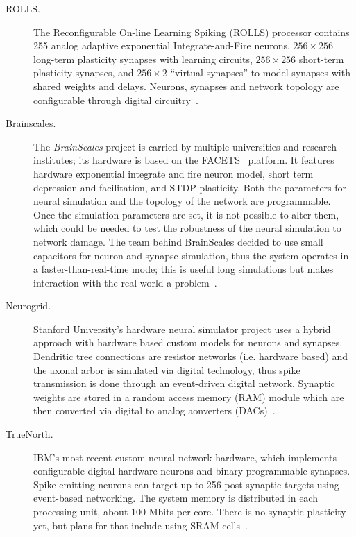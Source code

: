 \begin{description}
  
\item[ROLLS.] The Reconfigurable On-line Learning Spiking (ROLLS) processor 
contains 255 analog adaptive exponential Integrate-and-Fire neurons, $256\times 
256$ long-term plasticity synapses with learning circuits, $256\times 256$ 
short-term plasticity synapses, and $256\times 2$ ``virtual synapses'' to model 
synapses with shared weights and delays. Neurons, synapses and network topology 
are configurable through digital circuitry~\cite{rolls-processor}.

\item[Brainscales.] The \emph{BrainScales} project is carried by multiple universities and research institutes; its hardware is based on the FACETS~ platform\cite{brainscales-schemmel2010wafer}. It features hardware exponential integrate and fire neuron model, short term depression and facilitation, and STDP plasticity. Both the parameters for neural simulation and the topology of the network are programmable. Once the simulation parameters are set, it is not possible to alter them, which could be needed to test the robustness of the neural simulation to network damage. The team behind BrainScales decided to use small capacitors for neuron and synapse simulation, thus the system operates in a faster-than-real-time mode; this is useful long simulations but makes interaction with the real world a problem~\cite{neuro-platforms-summary-7159144,brainscales-homepage}. 

\item[Neurogrid.] Stanford University's hardware neural simulator project uses a hybrid approach with hardware based custom models for neurons and synapses. Dendritic tree connections are resistor networks (i.e. hardware based) and the axonal arbor is simulated via  digital technology, thus spike transmission is done through an event-driven digital network. Synaptic weights are stored in a random access memory (RAM) module which are then converted via  digital to analog aonverters (DACs)~\cite{neurogrid-6805187}. 

\item[TrueNorth.] IBM's most recent custom neural network hardware, which implements configurable digital hardware neurons and binary programmable synapses. Spike emitting neurons can target up to 256 post-synaptic targets using event-based networking. The system memory is distributed in each processing unit, about 100 Mbits per core. There is no synaptic plasticity yet, but plans for that include using SRAM cells~\cite{truenorth-web}. 


\end{description}
